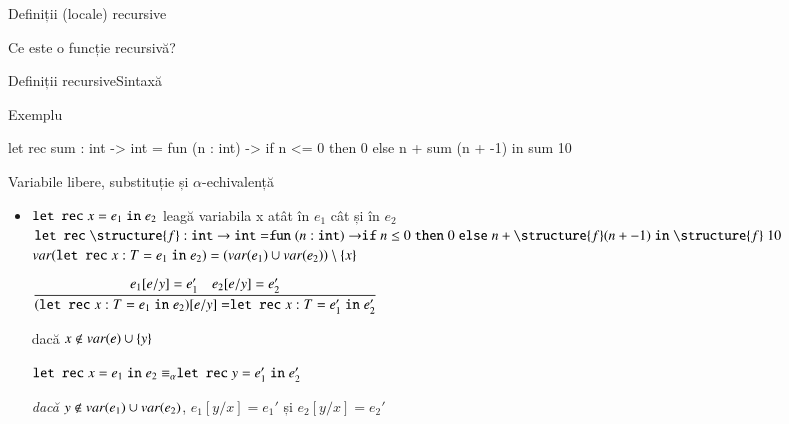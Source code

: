 \documentclass[xcolor=pdftex,romanian,colorlinks]{beamer}
\begin{document}
\begin{section}{Definiții (locale) recursive}
\begin{frame}{Ce este o funcție recursivă?}


\end{frame}


\begin{frame}[fragile]{Definiții recursive}{Sintaxă}

\vfill
\begin{block}{Exemplu}
\begin{asciiml}
let rec sum : int -> int = 
  fun (n : int) ->
    if n <= 0 
    then 0 
    else n + sum (n + -1)
in sum 10 
\end{asciiml}
\end{block}
\end{frame}

\begin{frame}{Variabile libere, substituție și $\alpha$-echivalență}
\begin{itemize}
\item $\mathrel{\text{\ttfamily let rec}} x = e_1 \mathrel{\text{\ttfamily in}} e_2$ leagă variabila x atât în $e_1$ cât și în $e_2$
{\small
\(\Sletrec \structure{f} : {\Sint} \rightarrow {\Sint} = \Sfun (n:{\Sint})\rightarrow \Sif n \leq 0 \Sthen 0 \Selse n + \structure{f} (n + -1) \Sin \structure{f}\; 10\) 
}
\vitem $\mathop{var}(\mathrel{\text{\ttfamily let rec}} x : T = e_1 \mathrel{\text{\ttfamily in}} e_2) = (\mathop{var}(e_1) \cup \mathop{var}(e_2)) \setminus \{x\}$

\vitem $\displaystyle\reg{(\Sletrec x : T = e_1 \Sin e_2)[e/y] = \Sletrec x : T = e_1' \Sin e_2'}{e_1[e/y] = e_1' \si e_2[e/y] = e_2'}{}$

\hfill dacă ${x\not\in \mathop{var}(e)\cup \{ y\}}$

\vitem $\mathrel{\text{\ttfamily let rec}} x = e_1 \mathrel{\text{\ttfamily in}} e_2 \equiv_\alpha \mathrel{\text{\ttfamily let rec}} y = e_1' \mathrel{\text{\ttfamily in}} e_2'$

 \hfill {\it dacă} $y\not\in \mathop{var}(e_1)\cup \mathop{var}(e_2)$, $e_1[y/x] = e_1'$ și $e_2[y/x] = e_2'$ 
 

\end{itemize}
\end{frame}
\end{section}
\end{document}
